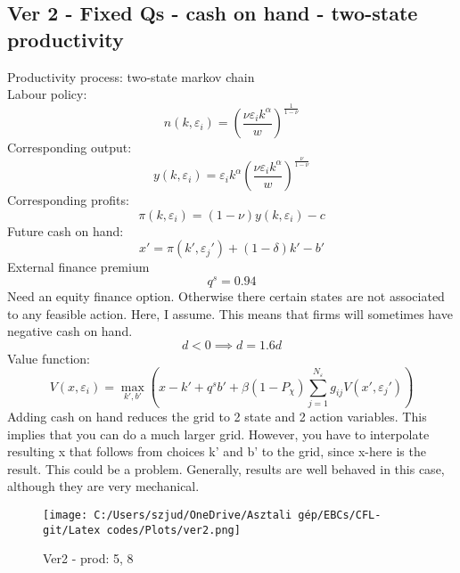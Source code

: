\documentclass[12pt]{article}
\begin{document}
\subsection*{Ver 2 - Fixed Qs - cash on hand - two-state productivity}
Productivity process: two-state markov chain \vspace{3mm} \\
Labour policy: 
\begin{equation}
    n(k,\varepsilon_i) = \left( \dfrac{ \nu \varepsilon_i k^\alpha}{w} \right)^{\frac{1}{1-\nu}}
\end{equation}
Corresponding output: 
\begin{equation}
    y(k,\varepsilon_i) = \varepsilon_i k^{\alpha} \left( \dfrac{\nu \varepsilon_i k^\alpha}{w} \right)^{\frac{\nu}{1-\nu}}
\end{equation}
Corresponding profits: 
\begin{equation}
    \pi(k,\varepsilon_i) = (1-\nu) y(k,\varepsilon_i) - c
\end{equation}
Future cash on hand: 
\begin{equation}
   x' = \pi(k',\varepsilon_j')+(1-\delta)k'-b'
\end{equation}
External finance premium 
\begin{equation}
    q^s = 0.94
\end{equation}
Need an equity finance option. Otherwise there certain states are not associated to any feasible action. Here, I assume. This means that firms will sometimes have negative cash on hand. 
\begin{equation}
    d < 0 \implies d = 1.6d
\end{equation}
Value function:
\begin{equation}
     V(x,\varepsilon_i) = \max_{k',b'}  \left(x - k' +  q^s b' + 
            \beta  (1-P_\chi)  \sum_{j=1}^{N_\varepsilon} g_{ij} V(x',\varepsilon_j') \right)
\end{equation}
Adding cash on hand reduces the grid to 2 state and 2 action variables. This implies that you can do a much larger grid. However, you have to interpolate resulting x that follows from choices k' and b' to the grid, since x-here is the result. This could be a problem. Generally, results are well behaved in this case, although they are very mechanical. 


\begin{figure}[H]  %
    \centering
    \caption{Ver2 - prod: 5, 8} \label{chart:CFLcdf}
    \texttt{[image: C:/Users/szjud/OneDrive/Asztali gép/EBCs/CFL-git/Latex codes/Plots/ver2.png]}
\end{figure}
\end{document}
